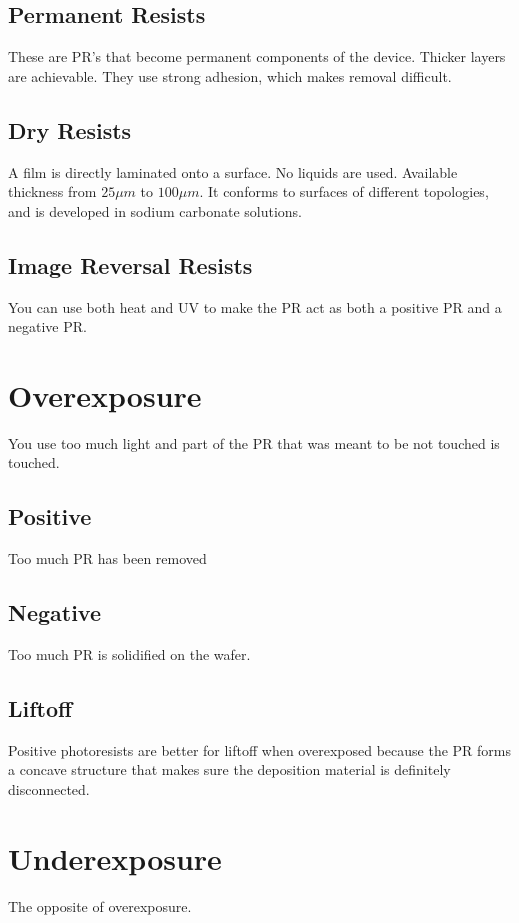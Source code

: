 \documentclass[fleqn]{report}
\begin{document}
\subsection{Permanent Resists}
These are PR's that become permanent components of the device. 
Thicker layers are achievable.
They use strong adhesion, which makes removal difficult.

\subsection{Dry Resists}
A film is directly laminated onto a surface. No liquids are used. 
Available thickness from $25\mu m$ to $100 \mu m$. It conforms 
to surfaces of different topologies, and is developed in sodium 
carbonate solutions.

\subsection{Image Reversal Resists}
You can use both heat and UV to make the PR act as both a 
positive PR and a negative PR. 

\section{Overexposure}
You use too much light and part of the PR that was meant to be 
not touched is touched. 

\subsection{Positive}
Too much PR has been removed 

\subsection{Negative}
Too much PR is solidified on the wafer.

\subsection{Liftoff}
Positive photoresists are better for liftoff when overexposed because 
the PR forms a concave structure that makes sure the deposition material 
is definitely disconnected. 

\section{Underexposure}
The opposite of overexposure. 
\end{document}
